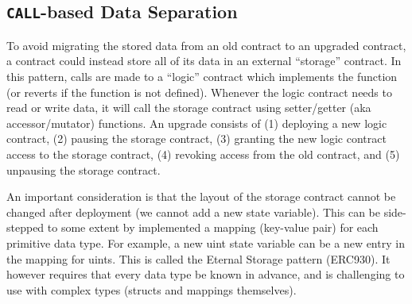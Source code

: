 



\subsection{\texttt{CALL}-based Data Separation}
\label{sec:callbased}

To avoid migrating the stored data from an old contract to an upgraded contract, a contract could instead store all of its data in an external ``storage'' contract. In this pattern, calls are made to a ``logic'' contract which implements the function (or reverts if the function is not defined). Whenever the logic contract needs to read or write data, it will call the storage contract using setter/getter (aka accessor/mutator) functions. An upgrade consists of (1) deploying a new logic contract, (2) pausing the storage contract, (3) granting the new logic contract access to the storage contract, (4) revoking access from the old contract, and (5) unpausing the storage contract. 

An important consideration is that the layout of the storage contract cannot be changed after deployment (\eg we cannot add a new state variable). This can be side-stepped to some extent by implemented a mapping (key-value pair) for each primitive data type. For example, a new uint state variable can be a new entry in the mapping for uints. This is called the Eternal Storage pattern (ERC930). It however requires that every data type be known in advance, and is challenging to use with complex types (\eg structs and mappings themselves).

